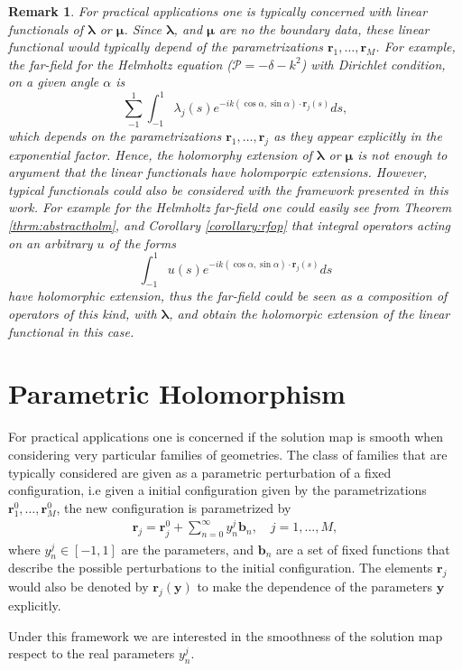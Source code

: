 \documentclass{article}
\newtheorem{remark}[theorem]{Remark}
\newcommand{\bmu} {\bm{\mu}}
\newcommand{\cP}{\mathcal{P}}
\newcommand{\bla}{\boldsymbol \lambda}
\newcommand{\br}{\bm{r}}
\newcommand{\by}{\bm{y}}
\newcommand{\bb}{\bm{b}}
\begin{document}
\begin{remark}
\label{rem:functionalholorphism}
For practical applications one is typically concerned with linear functionals of $\bla$ or $\bmu$. Since $\bla$, and $\bmu$ are no the boundary data, these linear functional would typically depend of the parametrizations $\br_1, \hdots,\br_M$. For example, the far-field for the Helmholtz equation ($\cP = -\delta - k^2$)  with Dirichlet condition, on a given angle $\alpha$ is 
$$
\sum_{-1}^1 \int_{-1}^1 \lambda_j(s) e^{-ik(\cos \alpha , \sin \alpha)\cdot \br_j(s)} ds ,
$$
which depends on the parametrizations $\br_1, \hdots, \br_j$ as they appear explicitly in the exponential factor. Hence, the holomorphy extension of $\bla$ or $\bmu$ is not enough to argument that the linear functionals have holomporpic extensions. However, typical functionals could also be considered with the framework presented in this work. For example for the Helmholtz far-field one could easily see from Theorem \ref{thrm:abstractholm}, and Corollary \ref{corollary:rfop} that integral operators acting on an arbitrary $u$ of the forms
$$
\int_{-1}^1 u(s) e^{-ik(\cos \alpha , \sin \alpha)\cdot \br_j(s)} ds
$$
have holomorphic extension, thus the far-field could be seen as a composition of operators of this kind, with $\bla$, and obtain the holomorpic extension of the linear functional in this case. 
\end{remark}

\section{Parametric Holomorphism}

For practical applications one is concerned if the solution map is smooth when considering very particular families of geometries. The class of families that are typically considered are given as a parametric perturbation of a fixed configuration, i.e given a initial configuration given by the parametrizations $\br_1^0,\hdots,\br_M^0$,  the new configuration is parametrized by 
\begin{align}
\label{eq:geoY}
\br_j = \br_j^0 +\sum_{n=0}^\infty y^j_n \bb_n, \quad j =1,\hdots,M,
\end{align}
where $y^j_n \in [-1,1]$ are the parameters, and $\bb_n$ are a set of fixed functions that describe the possible perturbations to the initial configuration. The elements $\br_j$ would also be denoted by $\br_j(\by)$ to make the dependence of the parameters $\by$ explicitly.

Under this framework we are interested in the smoothness of the solution map respect to the real parameters $y^j_n$.
\end{document}
